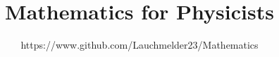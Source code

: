 \documentclass[11pt]{report}
\theoremstyle{definition}
\theoremstyle{remark}
\theoremstyle{plain}
\begin{document}
\title{Mathematics for Physicists}
\author{https://www.github.com/Lauchmelder23/Mathematics}
\maketitle
\doclicenseThis
\tableofcontents






\end{document}
